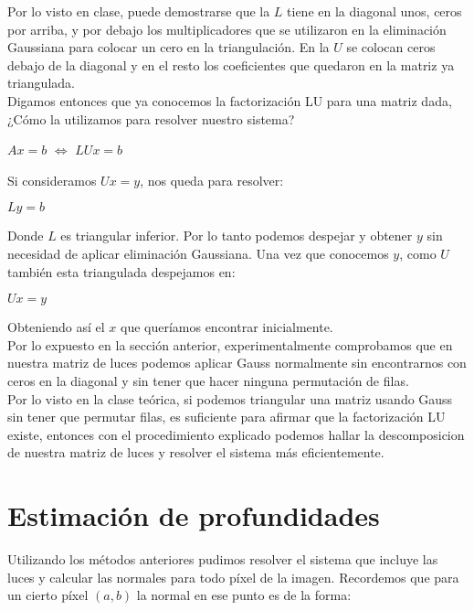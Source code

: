 Por lo visto en clase, puede demostrarse que la $L$ tiene en la diagonal unos, ceros por arriba, y por debajo los multiplicadores que se utilizaron en la eliminación Gaussiana para colocar un cero en la triangulación. En la $U$ se colocan ceros debajo de la diagonal y en el resto los coeficientes que quedaron en la matriz ya triangulada. \\

Digamos entonces que ya conocemos la factorización LU para una matriz dada, ¿Cómo la utilizamos para resolver nuestro sistema?

\begin{center}
    $Ax = b$ $\iff$ $LUx = b$
\end{center}

Si consideramos $Ux = y$, nos queda para resolver:

\begin{center}
    $Ly = b$
\end{center}

Donde $L$ es triangular inferior. Por lo tanto podemos despejar y obtener $y$ sin necesidad de aplicar eliminación Gaussiana. Una vez que conocemos $y$, como $U$ también esta triangulada despejamos en:

\begin{center}
    $Ux = y$
\end{center}

Obteniendo así el $x$ que queríamos encontrar inicialmente. \\

Por lo expuesto en la sección anterior, experimentalmente comprobamos que en nuestra matriz de luces podemos aplicar Gauss normalmente sin encontrarnos con ceros en la diagonal y sin tener que hacer ninguna permutación de filas. \\

Por lo visto en la clase teórica, si podemos triangular una matriz usando Gauss sin tener que permutar filas, es suficiente para afirmar que la factorización LU existe, entonces con el procedimiento explicado podemos hallar la descomposicion de nuestra matriz de luces y resolver el sistema más eficientemente. \\

\newpage
\section{Estimación de profundidades}

Utilizando los métodos anteriores pudimos resolver el sistema que incluye las luces y calcular las normales para todo píxel de la imagen. Recordemos que para un cierto píxel $(a, b)$ la normal en ese punto es de la forma:

